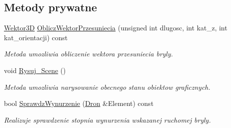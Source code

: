 \subsection*{Metody prywatne}
\begin{DoxyCompactItemize}
\item 
\hyperlink{classSWektor}{Wektor3D} \hyperlink{classScena_a624e04176f4f183d5c78604b66925534}{Oblicz\+Wektor\+Przesuniecia} (unsigned int dlugosc, int kat\+\_\+z, int kat\+\_\+orientacji) const
\begin{DoxyCompactList}\small\item\em Metoda umozliwia obliczenie wektora przesuniecia bryly. \end{DoxyCompactList}\item 
void \hyperlink{classScena_afa809376ae94fea3e939b9e354f882d3}{Rysuj\+\_\+\+Scene} ()
\begin{DoxyCompactList}\small\item\em Metoda umozliwia narysowanie obecnego stanu obiektow graficznych. \end{DoxyCompactList}\item 
bool \hyperlink{classScena_ad718f45ba059441502ae63688acb43ba}{Sprawdz\+Wynurzenie} (\hyperlink{classDron}{Dron} \&Element) const
\begin{DoxyCompactList}\small\item\em Realizuje sprawdzenie stopnia wynurzenia wskazanej ruchomej bryly. \end{DoxyCompactList}\end{DoxyCompactItemize}
